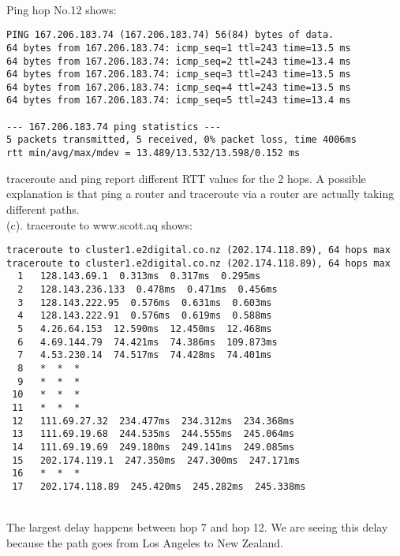 \documentclass[paper=a4, fontsize=11pt]{scrartcl} %
\numberwithin{equation}{section} %
\numberwithin{figure}{section} %
\numberwithin{table}{section} %
\begin{document}
~\\
Ping hop No.12 shows:
\begin{lstlisting}
PING 167.206.183.74 (167.206.183.74) 56(84) bytes of data.
64 bytes from 167.206.183.74: icmp_seq=1 ttl=243 time=13.5 ms
64 bytes from 167.206.183.74: icmp_seq=2 ttl=243 time=13.4 ms
64 bytes from 167.206.183.74: icmp_seq=3 ttl=243 time=13.5 ms
64 bytes from 167.206.183.74: icmp_seq=4 ttl=243 time=13.5 ms
64 bytes from 167.206.183.74: icmp_seq=5 ttl=243 time=13.4 ms

--- 167.206.183.74 ping statistics ---
5 packets transmitted, 5 received, 0% packet loss, time 4006ms
rtt min/avg/max/mdev = 13.489/13.532/13.598/0.152 ms
\end{lstlisting}
traceroute and ping report different RTT values for the 2 hops. A possible explanation is that ping a router and traceroute via a router are actually taking different paths.
~\\[18pt]
(c). traceroute to www.scott.aq shows:
\begin{lstlisting}
traceroute to cluster1.e2digital.co.nz (202.174.118.89), 64 hops max
traceroute to cluster1.e2digital.co.nz (202.174.118.89), 64 hops max
  1   128.143.69.1  0.313ms  0.317ms  0.295ms 
  2   128.143.236.133  0.478ms  0.471ms  0.456ms 
  3   128.143.222.95  0.576ms  0.631ms  0.603ms 
  4   128.143.222.91  0.576ms  0.619ms  0.588ms 
  5   4.26.64.153  12.590ms  12.450ms  12.468ms 
  6   4.69.144.79  74.421ms  74.386ms  109.873ms 
  7   4.53.230.14  74.517ms  74.428ms  74.401ms 
  8   *  *  * 
  9   *  *  * 
 10   *  *  * 
 11   *  *  * 
 12   111.69.27.32  234.477ms  234.312ms  234.368ms 
 13   111.69.19.68  244.535ms  244.555ms  245.064ms 
 14   111.69.19.69  249.180ms  249.141ms  249.085ms 
 15   202.174.119.1  247.350ms  247.300ms  247.171ms 
 16   *  *  * 
 17   202.174.118.89  245.420ms  245.282ms  245.338ms
 \end{lstlisting}
 ~\\
 The largest delay happens between hop 7 and hop 12. We are seeing this delay because the path goes from Los Angeles to New Zealand.
\end{document}
